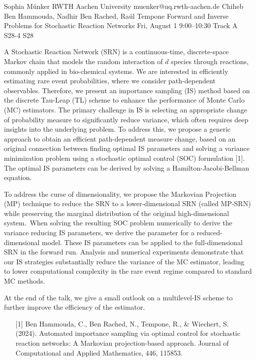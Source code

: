 \begin{talk}
  {Sophia Münker}%
  {RWTH Aachen University}%
  {muenker@uq.rwth-aachen.de}%
  {Chiheb Ben Hammouda, Nadhir Ben Rached, Raúl Tempone}%
  {Forward and Inverse Problems for Stochastic Reaction Networks}%
  {}%
  {Fri, August 1 9:00–10:30 Track A}%
  {S28-4}%
  {S28}%
				
			
A Stochastic Reaction Network (SRN) is a continuous-time, discrete-space Markov chain that models the random interaction of $d$ species through reactions, commonly applied in bio-chemical systems. We are interested in efficiently estimating rare event probabilities, where we consider path-dependent observables. Therefore, we present an importance sampling (IS) method based on the discrete Tau-Leap (TL) scheme to enhance the performance of Monte Carlo (MC) estimators. The primary challenge in IS is selecting an appropriate change of probability measure to significantly reduce variance, which often requires deep insights into the underlying problem. To address this, we propose a generic approach to obtain an efficient path-dependent measure change, based on an original connection between finding optimal IS parameters and solving a variance minimization problem using a stochastic optimal control (SOC) formulation [1]. The optimal IS parameters can be derived by solving a Hamilton-Jacobi-Bellman equation.

To address the curse of dimensionality, we propose the Markovian Projection (MP) technique to reduce the SRN to a lower-dimensional SRN (called MP-SRN) while preserving the marginal distribution of the original high-dimensional system. When solving the resulting SOC problem numerically to derive the variance reducing IS parameters, we derive the parameter for a reduced-dimensional model. These IS parameters can be applied to the full-dimensional SRN in the forward run. Analysis and numerical experiments demonstrate that our IS strategies substantially reduce the variance of the MC estimator, leading to lower computational complexity in the rare event regime compared to standard MC methods. 

At the end of the talk, we give a small outlook on a multilevel-IS scheme to further improve the efficiency of the estimator.


\begin{enumerate}
   \item[{[1]}] Ben Hammouda, C., Ben Rached, N., Tempone, R., \& Wiechert, S. (2024). Automated importance sampling via optimal control for stochastic reaction networks: A Markovian projection-based approach. Journal of Computational and Applied Mathematics, 446, 115853.
\end{enumerate}

\medskip
\end{talk}

